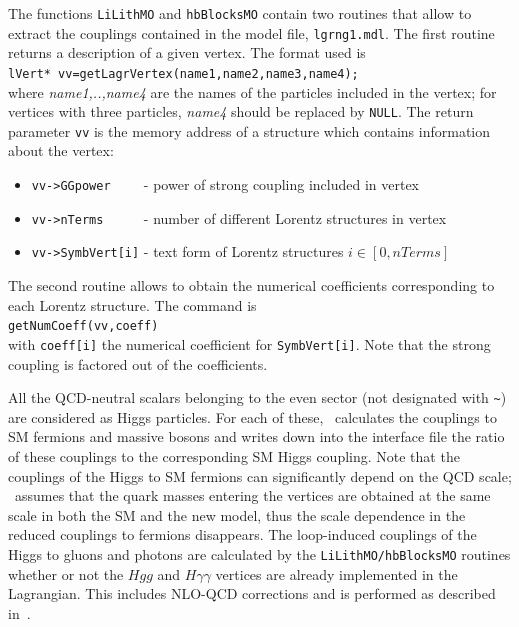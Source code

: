 \documentclass[12pt,a4paper]{article}
\begin{document}
{The functions {\tt LiLithMO} and {\tt hbBlocksMO} contain two routines  that allow  to extract the couplings contained in the model file, {\tt lgrng1.mdl}.    
The first routine returns a description of a given vertex. The format used is \\

\verb|lVert* vv=getLagrVertex(name1,name2,name3,name4);|\\

\noindent
where {\it name1,..,name4 } are the names of the particles included  in the vertex; for vertices with three particles, {\it name4} should be replaced by
{\tt NULL}.  The return parameter {\tt vv} is the memory address of a structure which contains information about the vertex:
\begin{itemize}
\item \verb|vv->GGpower    | - power of strong coupling included in vertex
\item \verb|vv->nTerms     | - number of different  Lorentz structures in vertex
\item \verb|vv->SymbVert[i]| - text form of Lorentz structures $i\in [0,nTerms]$  
\end{itemize}
The second routine allows to obtain the numerical coefficients corresponding to  each  Lorentz structure. The command is\\

\verb|getNumCoeff(vv,coeff)| \\

\noindent
with {\tt coeff[i]} the numerical coefficient for {\tt SymbVert[i]}. Note that the strong coupling is factored out of the coefficients. 

 
All the QCD-neutral scalars belonging to the even sector (not designated with \verb|~|)  are considered as  Higgs particles. For each of these, \micro\ calculates  the couplings to  SM fermions and massive  bosons and  writes down into the interface file the ratio of these couplings to the  corresponding  SM Higgs coupling. Note that the  couplings of the Higgs to   SM  fermions can significantly depend on the QCD scale; \micro\ assumes that the quark masses entering the vertices are obtained at the same scale in both  the
SM and  the new model, thus the scale dependence in the  reduced couplings to fermions disappears. 
The loop-induced  couplings of the Higgs to  gluons and photons are calculated by the {\tt LiLithMO/hbBlocksMO}  routines whether or not the $Hgg$ and $H\gamma\gamma$ vertices are already implemented in the Lagrangian. This includes NLO-QCD corrections and is performed as described in~\cite{Belanger:2013oya,Djouadi:1997yw}.

}
\end{document}
